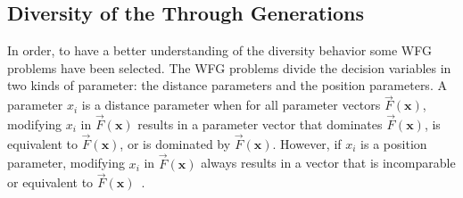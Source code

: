\begin{figure}[t]
\centering

\label{fig:variable-decision-scalability-2obj}
\end{figure}

\begin{figure}[t]
\centering

\label{fig:variable-decision-scalability-3obj}
\end{figure}

\subsection{Diversity of the \MOEAS{} Through Generations}

In order, to have a better understanding of the diversity behavior some WFG problems have been selected.
%
The WFG problems divide the decision variables in two kinds of parameter: the distance parameters and the position parameters.
%
A parameter $x_i$ is a distance parameter when for all parameter vectors $\vec{F}(\mathbf{x})$, modifying $x_i$ in $\vec{F}(\mathbf{x})$ results in a parameter vector that dominates $\vec{F}(\mathbf{x})$, is equivalent to $\vec{F}(\mathbf{x})$, or is dominated by $\vec{F}(\mathbf{x})$.
%
However, if $x_i$ is a position parameter, modifying $x_i$ in $\vec{F}(\mathbf{x})$ always results in a vector that is incomparable or equivalent to $\vec{F}(\mathbf{x})$~\cite{huband2005scalable}.
%


